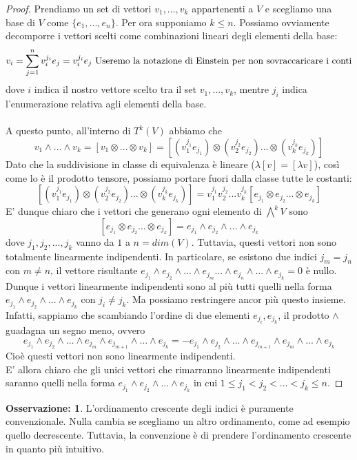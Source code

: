 \documentclass[12pt,a4paper]{report}
\theoremstyle{definition}
\theoremstyle{Theorem}
\theoremstyle{definition}
\theoremstyle{definition}
\theoremstyle{definition}
\newtheorem{Obs}[Def]{Osservazione:}
\begin{document}
	\begin{proof}
		Prendiamo un set di vettori $v_1,...,v_k$ appartenenti a $V$ e scegliamo una base di $V$ come $\{e_1,...,e_n\}$. Per ora supponiamo $k\leq n$. Possiamo ovviamente decomporre i vettori scelti come combinazioni lineari degli elementi della base:
		$$v_i=\sum_{j=1}^{n} v^{j_i}_i e_j=v^{j_i}_i e_j \hbox{ Useremo la notazione di Einstein per non sovraccaricare i conti}$$
		dove $i$ indica il nostro vettore scelto tra il set $v_1,...,v_k$, mentre $j_i$ indica l'enumerazione relativa agli elementi della base.\\
		\\
		A questo punto, all'interno di $T^k(V)$ abbiamo che
		$$v_1\wedge...\wedge v_k=[v_1\otimes...\otimes v_k]=[(v^{j_1}_1 e_{j_1})\otimes(v^{j_2}_2 e_{j_2})...\otimes (v^{j_k}_k e_{j_k})]$$
		Dato che la suddivisione in classe di equivalenza è lineare ($\lambda[v]=[\lambda v]$), così come lo è il prodotto tensore, possiamo portare fuori dalla classe tutte le costanti:
		$$[(v^{j_1}_1 e_{j_1})\otimes(v^{j_2}_2 e_{j_2})...\otimes (v^{j_k}_k e_{j_k})]=v^{j_1}_1v^{j_2}_2...v^{j_k}_k[ e_{j_1}\otimes e_{j_2}...\otimes  e_{j_k}]$$
		E' dunque chiaro che i vettori che generano ogni elemento di $\bigwedge^k V$ sono 
		$$[ e_{j_1}\otimes e_{j_2}...\otimes  e_{j_k}]= e_{j_1}\wedge e_{j_2}\wedge ...\wedge e_{j_k}$$
		dove $j_1,j_2,...,j_k$ vanno da $1$ a $n=dim(V)$. Tuttavia, questi vettori non sono totalmente linearmente indipendenti. In particolare, se esistono due indici $j_m=j_n$ con $m\neq n$, il vettore risultante $e_{j_1}\wedge e_{j_2}\wedge ...\wedge e_{j_m}...\wedge e_{j_n}\wedge...\wedge e_{j_k}=0$ è nullo. Dunque i vettori linearmente indipendenti sono al più tutti quelli nella forma $e_{j_1}\wedge e_{j_2}\wedge ...\wedge e_{j_k}$ con $j_i\neq j_k$. Ma possiamo restringere ancor più questo insieme. Infatti, sappiamo che scambiando l'ordine di due elementi $e_{j_i}, e_{j_k}$, il prodotto $\wedge$ guadagna un segno meno, ovvero
		$$e_{j_1}\wedge e_{j_2}\wedge ...\wedge e_{j_m}\wedge e_{j_{m+1}}\wedge...\wedge e_{j_k}=-e_{j_1}\wedge e_{j_2}\wedge ...\wedge e_{j_{m+1}}\wedge e_{j_{m}}\wedge...\wedge e_{j_k}$$
		Cioè questi vettori non sono linearmente indipendenti.\\
		E' allora chiaro che gli unici vettori che rimarranno linearmente indipendenti saranno quelli nella forma $e_{j_1}\wedge e_{j_2}\wedge ...\wedge e_{j_k}$ in cui $1\leq j_1<j_2<...< j_k\leq n$.
	\end{proof}
	\begin{Obs}
		L'ordinamento crescente degli indici è puramente convenzionale. Nulla cambia se scegliamo un altro ordinamento, come ad esempio quello decrescente. Tuttavia, la convenzione è di prendere l'ordinamento crescente in quanto più intuitivo.
	\end{Obs}
\end{document}
